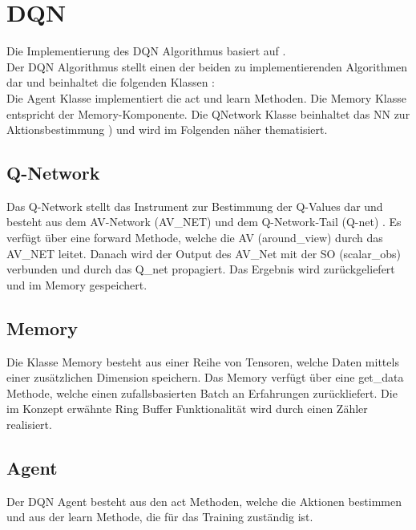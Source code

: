 \section{DQN} \label{sec:Implementierung_DQN}
Die Implementierung des DQN Algorithmus basiert auf \cite{Charles2013}.\\
Der DQN Algorithmus stellt einen der beiden zu implementierenden Algorithmen dar und beinhaltet die folgenden Klassen :\\
Die Agent Klasse implementiert die act  und learn  Methoden.
Die Memory Klasse entspricht der Memory-Komponente. Die QNetwork Klasse beinhaltet das NN zur Aktionsbestimmung ) und wird im Folgenden näher thematisiert.

\subsection{Q-Network} \label{subsec:Implementierung_Q-Network}
Das Q-Network stellt das Instrument zur Bestimmung der Q-Values dar und besteht aus dem AV-Network (AV\_NET) und dem Q-Network-Tail (Q-net) . Es verfügt über eine
forward Methode, welche die AV (around\_view) durch das AV\_NET leitet. Danach wird der Output des AV\_Net mit der SO (scalar\_obs) verbunden und durch das Q\_net propagiert. Das Ergebnis wird zurückgeliefert und im Memory gespeichert. 

\subsection{Memory} \label{subsec:Implementierung_Memory_DQN}
Die Klasse Memory besteht aus einer Reihe von Tensoren, welche Daten mittels einer zusätzlichen Dimension speichern.
Das Memory verfügt über eine get\_data Methode, welche einen zufallsbasierten Batch an Erfahrungen zurückliefert. Die im Konzept erwähnte Ring Buffer Funktionalität wird durch einen Zähler realisiert. 

\subsection{Agent} \label{subsec:Implementierung_DQN_Agent}
Der DQN Agent besteht aus den act Methoden, welche die Aktionen bestimmen und aus der learn Methode, die für das Training zuständig ist.

